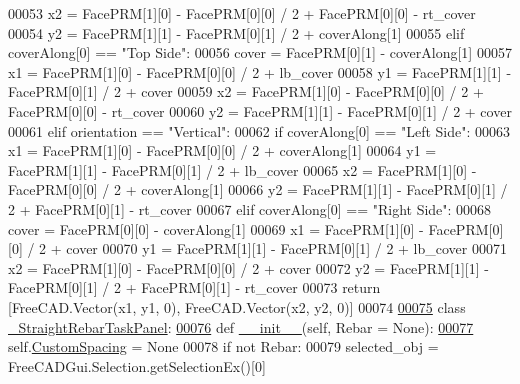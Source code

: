 \begin{DoxyCode}
00053             x2 = FacePRM[1][0] - FacePRM[0][0] / 2 + FacePRM[0][0] - rt\_cover
00054             y2 = FacePRM[1][1] - FacePRM[0][1] / 2 + coverAlong[1]
00055         \textcolor{keywordflow}{elif} coverAlong[0] == \textcolor{stringliteral}{"Top Side"}:
00056             cover = FacePRM[0][1] - coverAlong[1]
00057             x1 = FacePRM[1][0] - FacePRM[0][0] / 2 + lb\_cover
00058             y1 = FacePRM[1][1] - FacePRM[0][1] / 2 + cover
00059             x2 = FacePRM[1][0] - FacePRM[0][0] / 2 + FacePRM[0][0] - rt\_cover
00060             y2 = FacePRM[1][1] - FacePRM[0][1] / 2 + cover
00061     \textcolor{keywordflow}{elif} orientation == \textcolor{stringliteral}{"Vertical"}:
00062         \textcolor{keywordflow}{if} coverAlong[0] == \textcolor{stringliteral}{"Left Side"}:
00063             x1 = FacePRM[1][0] - FacePRM[0][0] / 2 + coverAlong[1]
00064             y1 = FacePRM[1][1] - FacePRM[0][1] / 2 + lb\_cover
00065             x2 = FacePRM[1][0] - FacePRM[0][0] / 2 + coverAlong[1]
00066             y2 = FacePRM[1][1] - FacePRM[0][1] / 2 + FacePRM[0][1] - rt\_cover
00067         \textcolor{keywordflow}{elif} coverAlong[0] == \textcolor{stringliteral}{"Right Side"}:
00068             cover = FacePRM[0][0] - coverAlong[1]
00069             x1 = FacePRM[1][0] - FacePRM[0][0] / 2 + cover
00070             y1 = FacePRM[1][1] - FacePRM[0][1] / 2 + lb\_cover
00071             x2 = FacePRM[1][0] - FacePRM[0][0] / 2 + cover
00072             y2 = FacePRM[1][1] - FacePRM[0][1] / 2 + FacePRM[0][1] - rt\_cover
00073     \textcolor{keywordflow}{return} [FreeCAD.Vector(x1, y1, 0), FreeCAD.Vector(x2, y2, 0)]
00074 
\hypertarget{StraightRebar_8py_source.tex_l00075}{}\hyperlink{classStraightRebar_1_1__StraightRebarTaskPanel}{00075} \textcolor{keyword}{class }\hyperlink{classStraightRebar_1_1__StraightRebarTaskPanel}{\_StraightRebarTaskPanel}:
\hypertarget{StraightRebar_8py_source.tex_l00076}{}\hyperlink{classStraightRebar_1_1__StraightRebarTaskPanel_ad740c5f357b97a2a327e7494bf2b712b}{00076}     \textcolor{keyword}{def }\hyperlink{classStraightRebar_1_1__StraightRebarTaskPanel_ad740c5f357b97a2a327e7494bf2b712b}{\_\_init\_\_}(self, Rebar = None):
\hypertarget{StraightRebar_8py_source.tex_l00077}{}\hyperlink{classStraightRebar_1_1__StraightRebarTaskPanel_a91d60c0007437af93af933a29c66a963}{00077}         self.\hyperlink{classStraightRebar_1_1__StraightRebarTaskPanel_a91d60c0007437af93af933a29c66a963}{CustomSpacing} = \textcolor{keywordtype}{None}
00078         \textcolor{keywordflow}{if} \textcolor{keywordflow}{not} Rebar:
00079             selected\_obj = FreeCADGui.Selection.getSelectionEx()[0]

\end{DoxyCode}

